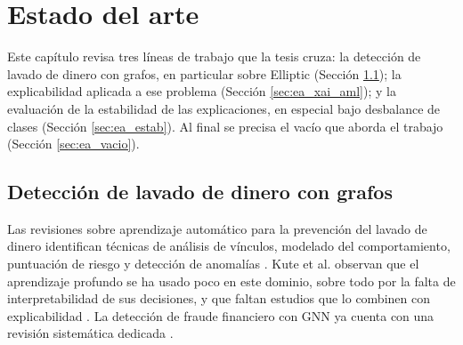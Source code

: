 \chapter{Estado del arte}\label{cap:estado}

Este capítulo revisa tres líneas de trabajo que la tesis cruza: la detección de lavado de
dinero con grafos, en particular sobre Elliptic (Sección \ref{sec:ea_aml}); la explicabilidad
aplicada a ese problema (Sección \ref{sec:ea_xai_aml}); y la evaluación de la estabilidad de
las explicaciones, en especial bajo desbalance de clases (Sección \ref{sec:ea_estab}). Al
final se precisa el vacío que aborda el trabajo (Sección \ref{sec:ea_vacio}).

\section{Detección de lavado de dinero con grafos}\label{sec:ea_aml}

Las revisiones sobre aprendizaje automático para la prevención del lavado de dinero identifican técnicas de análisis de vínculos, modelado del comportamiento, puntuación de riesgo y detección de anomalías \cite{Chen2018AMLReview}. Kute et al. observan que el aprendizaje profundo se ha usado poco en este dominio, sobre todo por la falta de interpretabilidad de sus decisiones, y que faltan estudios que lo combinen con explicabilidad \cite{Kute2021AMLReview}. La detección de fraude financiero con GNN ya cuenta con una revisión sistemática dedicada \cite{Motie2024FraudGNN}.

